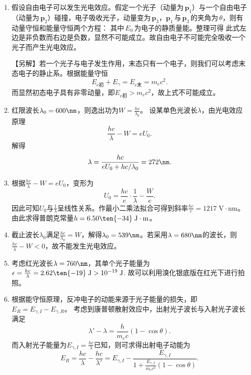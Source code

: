 \begin{enumerate}[label=1.\arabic*]
\item%
假设自由电子可以发生光电效应。假定一个光子（动量为$\,\mathbf{p}_1$）与一个自由电子（动量为$\,\mathbf{p}_2$）碰撞，电子吸收光子，动量变为$\,\mathbf{p}_3$，$\mathbf{p}_1\,$与$\,\mathbf{p}_3\,$的夹角为$\,\theta$，则有动量守恒和能量守恒两个方程：
其中$\,E_0\,$为电子的静质量能。整理可得
此式左边是非负数而右边是负数，显然不可能成立。故自由电子不可能完全吸收一个光子而产生光电效应。

【另解】若一个光子与电子发生作用，末态只有一个电子，则我们可以考虑末态电子的静止系。根据能量守恒
\[E_{e\text{初}} + E_\gamma = E_{e\text{末}} = m_e c^2.\]
而显然初态电子具有非零动量，即$E_{e\text{初}}>m_e c^2$，故上式不可能成立。

\item
红限波长$\lambda_0 = 600\nm$，则逸出功为$W=\frac{hc}{\lambda_0}$。
设某单色光波长$\lambda$，由光电效应原理
\[\frac{hc}{\lambda}-W = eU_0.\]
解得
\[\lambda=\frac{hc}{eU_0+hc/\lambda_0} = 272\nm.\]

\item
根据$\frac{hc}{\lambda}-W = eU_0$，变形为
\[U_0 = \frac{hc}{e}\cdot \frac{1}{\lambda}-\frac{W}{e}.\]
因此可知$U_0$与$\frac{1}{\lambda}$呈线性关系。作最小二乘法拟合可得到斜率$\frac{hc}{e} = 1217\;\mathrm{V\cdot nm}$。由此求得普朗克常量$h=6.50\ten{-34}\;\mathrm{J\cdot m}$。

\item
截止波长$\lambda_0$满足$\frac{hc}{\lambda_0}=W$，解得$\lambda_0 = 539\nm$。若采用$\lambda=680\nm$的波长，则$\frac{hc}{\lambda}-W<0$，故不能发生光电效应。

\item
考虑红光波长$\lambda=760\nm$，其单个光子能量为$\epsilon = \frac{hc}{\lambda}=2.62\ten{-19}\;\mathrm{J}>10^{-19}\;\mathrm{J}$.
故可以利用溴化银底版在红光下进行拍照。

\item
根据能守恒原理，反冲电子的动能来源于光子能量的损失，即$E_R = E_{\gamma,I}-E_{\gamma,R}$。
考虑到康普顿散射效应中，出射光子波长与入射光子波长满足
\[\lambda'-\lambda = \frac{h}{m_e c}(1-\cos\theta).\]
而入射光子能量为$E_{\gamma,I}=\frac{hc}{\lambda}$已知，则可求得出射电子动能为
\[E_R = \frac{hc}{\lambda}-\frac{hc}{\lambda'} = E_{\gamma,I} - \frac{E_{\gamma,I}}{1+\frac{E_{\gamma,I}}{m_e c^2}(1-\cos\theta)}.\]


\end{enumerate}
